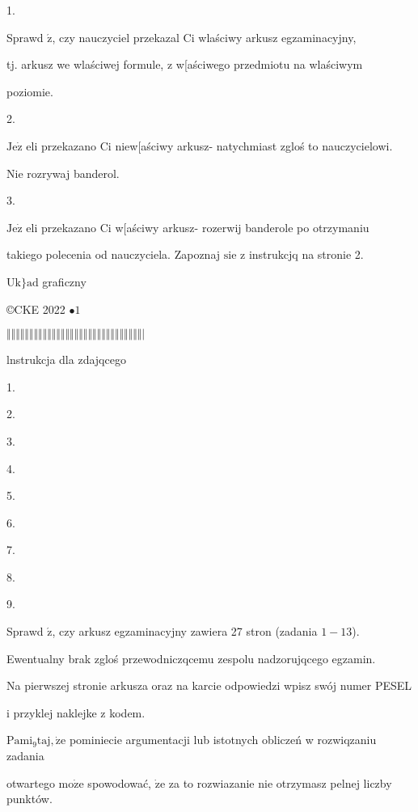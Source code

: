 \documentclass[a4paper,12pt]{article}
\begin{document}
1.

Sprawd $\acute{\mathrm{z}}$, czy nauczyciel przekazal Ci wlaściwy arkusz egzaminacyjny,

tj. arkusz we wlaściwej formule, z w[aściwego przedmiotu na wlaściwym

poziomie.

2.

$\mathrm{J}\mathrm{e}\dot{\mathrm{z}}$ eli przekazano Ci niew[aściwy arkusz- natychmiast zgloś to nauczycielowi.

Nie rozrywaj banderol.

3.

$\mathrm{J}\mathrm{e}\dot{\mathrm{z}}$ eli przekazano Ci w[aściwy arkusz- rozerwij banderole po otrzymaniu

takiego polecenia od nauczyciela. Zapoznaj $\mathrm{s}\mathrm{i}\mathrm{e}$ z instrukcjq na stronie 2.

$\mathrm{U}\mathrm{k}\}\mathrm{a}\mathrm{d}$ graficzny

\copyright CKE 2022 $\bullet 1$

$\Vert\Vert\Vert\Vert\Vert\Vert\Vert\Vert\Vert\Vert\Vert\Vert\Vert\Vert\Vert\Vert\Vert\Vert\Vert\Vert\Vert\Vert\Vert\Vert\Vert\Vert\Vert\Vert\Vert\Vert|$




lnstrukcja dla zdajqcego

1.

2.

3.

4.

5.

6.

7.

8.

9.

Sprawd $\acute{\mathrm{z}}$, czy arkusz egzaminacyjny zawiera 27 stron (zadania $1-13$).

Ewentualny brak zgloś przewodniczqcemu zespolu nadzorujqcego egzamin.

Na pierwszej stronie arkusza oraz na karcie odpowiedzi wpisz swój numer PESEL

i przyklej naklejke z kodem.

$\mathrm{P}\mathrm{a}\mathrm{m}\mathrm{i}_{9}\mathrm{t}\mathrm{a}\mathrm{j}, \dot{\mathrm{z}}\mathrm{e}$ pominiecie argumentacji lub istotnych obliczeń w rozwiqzaniu zadania

otwartego $\mathrm{m}\mathrm{o}\dot{\mathrm{z}}\mathrm{e}$ spowodować, $\dot{\mathrm{z}}\mathrm{e}$ za to rozwiazanie nie otrzymasz pelnej liczby punktów.
\end{document}
